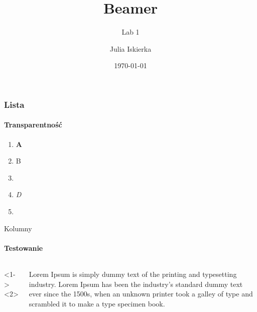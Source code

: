 \documentclass{beamer}
\title{Beamer}
\subtitle{Lab 1}
\author{Julia Iskierka}
\date{\today}
\begin{document}
\frame{\titlepage}

\begin{frame}
	\frametitle{Lista}
	\framesubtitle{Transparentność}
	\begin{enumerate}
		\item<1,3-> \textbf<5>{A}
		\item<2-3,4-> \alert<5>{B}
		\item<1-> 
		\item<3-> \textit<5>{D}
		\item<4-> 
	\end{enumerate}
\end{frame}

\begin{frame}{Kolumny}
	\framesubtitle{Testowanie}
	\begin{columns}
		<1->
		<2>
		
	Lorem Ipsum is simply dummy text of the printing and typesetting industry. Lorem Ipsum has been the industry's standard dummy text ever since the 1500s, when an unknown printer took a galley of type and scrambled it to make a type specimen book.
	
	\end{columns}
\end{frame}
\end{document}
